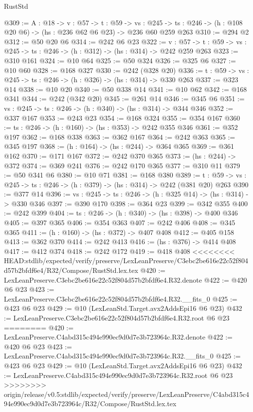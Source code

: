 \begin{lexlean}{RustStd}
\begin{coremodule}
{\begin{coremodule}
@309 := {A : @18} ->
  {v : @57} ->
  {t : @59} ->
  {vs : @245} -> {ts : @246} -> (h : @108 @20 @6) -> (hs : @236 @62 @6 @23) -> @236 @60 @259 @263
@310 := @294 @2
@312 := @50 @20 @6
@314 := @242 @6 @23
@322 := {v : @57} ->
  {t : @59} -> {vs : @245} -> {ts : @246} -> (h : @312) -> (hs : @314) -> @242 @259 @263
@323 := @310 @161
@324 := @10 @64
@325 := @50 @324
@326 := @325 @6
@327 := @10 @60
@328 := @168 @327
@330 := @242 (@328 @20)
@336 := {t : @59} -> {vs : @245} -> {ts : @246} -> (h : @326) -> (hs : @314) -> @330 @263
@337 := @323 @14
@338 := @10 @20
@340 := @50 @338 @14
@341 := @10 @62
@342 := @168 @341
@344 := @242 (@342 @20)
@345 := @261 @14
@346 := @345 @6
@351 := {vs : @245} -> {ts : @246} -> (h : @340) -> (hs : @314) -> @344 @346
@352 := @337 @167
@353 := @243 @23
@354 := @168 @324
@355 := @354 @167
@360 := {ts : @246} -> (h : @160) -> (hs : @353) -> @242 @355 @346
@361 := @352 @197
@362 := @168 @338
@363 := @362 @167
@364 := @242 @363
@365 := @345 @197
@368 := (h : @164) -> (hs : @244) -> @364 @365
@369 := @361 @162
@370 := @171 @167
@372 := @242 @370 @365
@373 := (hs : @244) -> @372
@374 := @369 @241
@376 := @242 @170 @365
@377 := @310 @11
@379 := @50 @341 @6
@380 := @10 @71
@381 := @168 @380
@389 := {t : @59} -> {vs : @245} -> {ts : @246} -> (h : @379) -> (hs : @314) -> @242 (@381 @20) @263
@390 := @377 @14
@396 := {vs : @245} -> {ts : @246} -> (h : @325 @14) -> (hs : @314) -> @330 @346
@397 := @390 @170
@398 := @364 @23
@399 := @342 @355
@400 := @242 @399
@404 := {ts : @246} -> (h : @340) -> (hs : @398) -> @400 @346
@405 := @397 @365
@406 := @354 @363
@407 := @242 @406
@408 := @345 @365
@411 := (h : @160) -> (hs : @372) -> @407 @408
@412 := @405 @158
@413 := @362 @370
@414 := @242 @413
@416 := (hs : @376) -> @414 @408
@417 := @412 @374
@418 := @242 @172
@419 := @418 @408
<<<<<<<< HEAD:stdlib/expected/verify/preserve/LexLeanPreserve/C3ebc2be616e22c52f804d57b2bfdf6e4/R32/Compose/RustStd.lex.tex
@420 := LexLeanPreserve.C3ebc2be616e22c52f804d57b2bfdf6e4.R32.denote
@422 := @420 @6 @23
@423 := LexLeanPreserve.C3ebc2be616e22c52f804d57b2bfdf6e4.R32.__fits_0
@425 := @423 @6 @23
@429 := @10 (LexLeanStd.Target.avx2AddsEpi16 @6 @23)
@432 := LexLeanPreserve.C3ebc2be616e22c52f804d57b2bfdf6e4.R32.root @6 @23
========
@420 := LexLeanPreserve.C4abd315c494e990ec9d0d7e3b723964c.R32.denote
@422 := @420 @6 @23
@423 := LexLeanPreserve.C4abd315c494e990ec9d0d7e3b723964c.R32.__fits_0
@425 := @423 @6 @23
@429 := @10 (LexLeanStd.Target.avx2AddsEpi16 @6 @23)
@432 := LexLeanPreserve.C4abd315c494e990ec9d0d7e3b723964c.R32.root @6 @23
>>>>>>>> origin/release/v0.5:stdlib/expected/verify/preserve/LexLeanPreserve/C4abd315c494e990ec9d0d7e3b723964c/R32/Compose/RustStd.lex.tex

\end{coremodule}}
\end{coremodule}
\end{lexlean}
